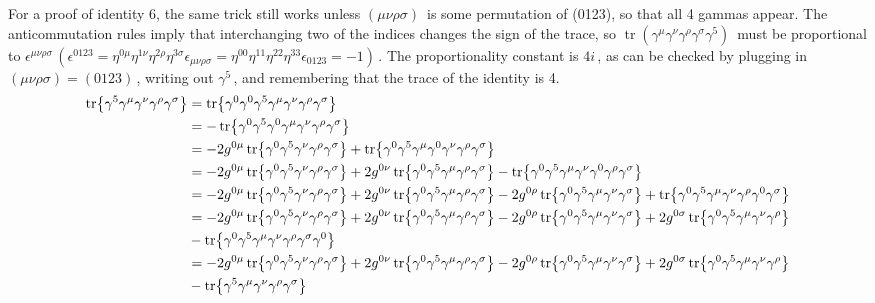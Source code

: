 \documentclass{article}
\newcommand{\gm}{\gamma^{\mu}}
\newcommand{\gn}{\gamma^{\nu}}
\newcommand{\gs}{\gamma^{\sigma}}
\newcommand{\gr}{\gamma^{\rho}}
\newcommand{\g}{\gamma}
\newcommand{\s}{\sigma}
\begin{document}
\begin{enumerate}[(i)]
  For a proof of identity 6, the same trick still works unless $ {\displaystyle (\mu \nu \rho \sigma )\,}$ is some permutation of (0123), so that all 4 gammas appear. The anticommutation rules imply that interchanging two of the indices changes the sign of the trace, so $ {\displaystyle \operatorname {tr} (\gamma ^{\mu }\gamma ^{\nu }\gamma ^{\rho }\gamma ^{\sigma }\gamma ^{5})\,}$ must be proportional to ${\displaystyle \epsilon ^{\mu \nu \rho \sigma }\,}$$ {\displaystyle (\epsilon ^{0123}=\eta ^{0\mu }\eta ^{1\nu }\eta ^{2\rho }\eta ^{3\sigma }\epsilon _{\mu \nu \rho \sigma }=\eta ^{00}\eta ^{11}\eta ^{22}\eta ^{33}\epsilon _{0123}=-1)\,}$. The proportionality constant is ${\displaystyle 4i\,}$, as can be checked by plugging in $ {\displaystyle (\mu \nu \rho \sigma )=(0123)\,} $, writing out $ {\displaystyle \gamma ^{5}\,}$, and remembering that the trace of the identity is 4.
  \begin{align*}
    \tr{\g^5\gm\gn\gr\gs}&=\tr{\g^0\g^0\g^5\gm\gn\gr\gs}\\
    &=-\tr{\g^0\g^5\g^0\gm\gn\gr\gs}\\
    &=-2g^{0\mu}\tr{\g^0\g^5\gn\gr\gs}+\tr{\g^0\g^5\gm\g^0\gn\gr\gs}\\
    &=-2g^{0\mu}\tr{\g^0\g^5\gn\gr\gs}+2g^{0\nu}\tr{\g^0\g^5\gm\gr\gs}-\tr{\g^0\g^5\gm\gn\g^0\gr\gs}\\
    &=-2g^{0\mu}\tr{\g^0\g^5\gn\gr\gs}+2g^{0\nu}\tr{\g^0\g^5\gm\gr\gs}-2g^{0\rho}\tr{\g^0\g^5\gm\gn\gs}+\tr{\g^0\g^5\gm\gn\gr\g^0\gs}\\
    &=-2g^{0\mu}\tr{\g^0\g^5\gn\gr\gs}+2g^{0\nu}\tr{\g^0\g^5\gm\gr\gs}-2g^{0\rho}\tr{\g^0\g^5\gm\gn\gs}+2g^{0\s}\tr{\g^0\g^5\gm\gn\gr}\\&-\tr{\g^0\g^5\gm\gn\gr\gs\g^0}\\
    &=-2g^{0\mu}\tr{\g^0\g^5\gn\gr\gs}+2g^{0\nu}\tr{\g^0\g^5\gm\gr\gs}-2g^{0\rho}\tr{\g^0\g^5\gm\gn\gs}+2g^{0\s}\tr{\g^0\g^5\gm\gn\gr}\\&-\tr{\g^5\gm\gn\gr\gs}\\

\end{align*}$$
\end{enumerate}
\end{document}
